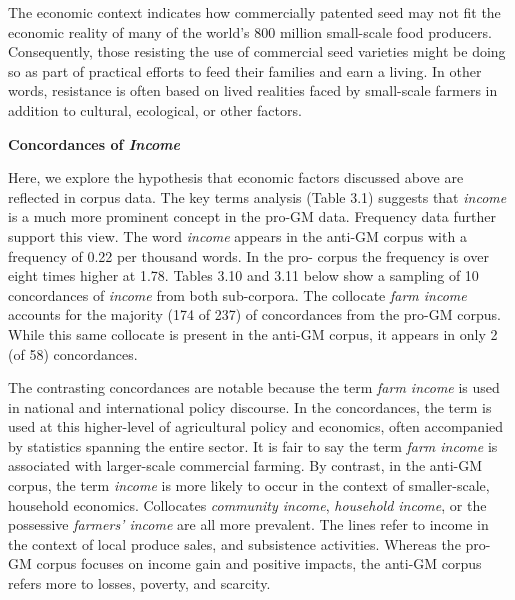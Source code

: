The economic context indicates how commercially patented seed may not fit the economic reality of many of the world's 800 million small-scale food producers. Consequently, those resisting the use of commercial seed varieties might be doing so as part of practical efforts to feed their families and earn a living. In other words, resistance is often based on lived realities faced by small-scale farmers in addition to cultural, ecological, or other factors.

\textbf{Concordances of \textit{Income}}

Here, we explore the hypothesis that economic factors discussed above are reflected in corpus data. The key terms analysis (Table 3.1) suggests that \textit{income} is a much more prominent concept in the pro-GM data. Frequency data further support this view. The word \textit{income} appears in the anti-GM corpus with a frequency of 0.22 per thousand words. In the pro- corpus the frequency is over eight times higher at 1.78. Tables 3.10 and 3.11 below show a sampling of 10 concordances of \textit{income} from both sub-corpora. The collocate \textit{farm income} accounts for the majority (174 of 237) of concordances from the pro-GM corpus. While this same collocate is present in the anti-GM corpus, it appears in only 2 (of 58) concordances.

The contrasting concordances are notable because the term \textit{farm income} is used in national and international policy discourse. In the concordances, the term is used at this higher-level of agricultural policy and economics, often accompanied by statistics spanning the entire sector. It is fair to say the term \textit{farm income} is associated with larger-scale commercial farming. By contrast, in the anti-GM corpus, the term \textit{income} is more likely to occur in the context of smaller-scale, household economics. Collocates \textit{community income}, \textit{household income}, or the possessive \textit{farmers' income} are all more prevalent. The lines refer to income in the context of local produce sales, and subsistence activities. Whereas the pro-GM corpus focuses on income gain and positive impacts, the anti-GM corpus refers more to losses, poverty, and scarcity.

